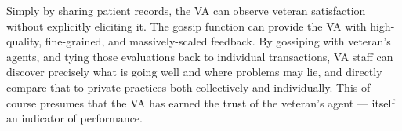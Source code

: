 Simply by sharing patient records, the VA can observe veteran satisfaction without explicitly eliciting it.
The gossip function can provide the VA with high-quality, fine-grained, and massively-scaled feedback.
By gossiping with veteran's agents, and tying those evaluations back to individual transactions, VA staff can discover precisely what is going well and where problems may lie, and directly compare that to private practices both collectively and individually.
This of course presumes that the VA has earned the trust of the veteran's agent --- itself an indicator of performance.
